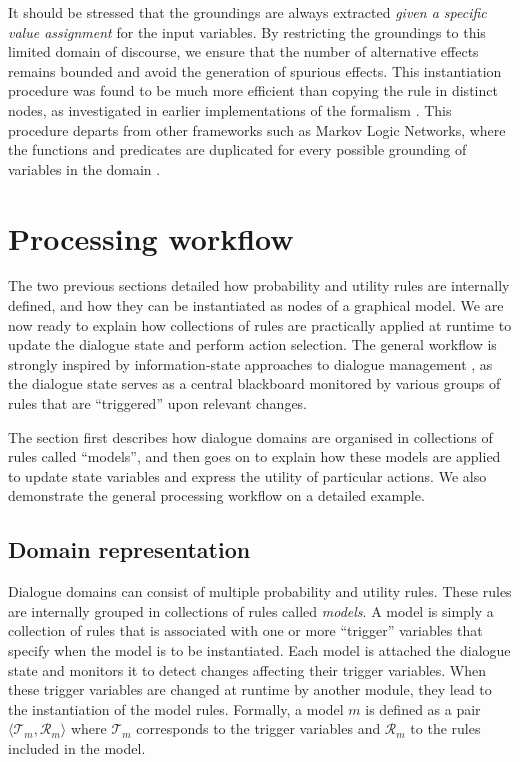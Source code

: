 It should be stressed that the groundings are always extracted \textit{given a specific value assignment} for the input variables. By restricting the groundings to this limited domain of discourse, we ensure that the number of alternative effects remains bounded and avoid the generation of spurious effects.   This instantiation procedure was found to be much more efficient than copying the rule in distinct nodes, as investigated in earlier implementations of the formalism \citep{relational-apl2012}.  This procedure departs from other frameworks such as Markov Logic Networks, where the functions and predicates are duplicated for every possible grounding of variables in the domain \citep{Richardson:2006}.



%

\section{Processing workflow}
\label{sec:processing-workflow}

The two previous sections detailed how probability and utility rules are internally defined, and how they can be instantiated as nodes of a graphical model. We are now ready to explain how collections of rules are practically applied at runtime to update the dialogue state and perform action selection. The general workflow is strongly inspired by information-state approaches to dialogue management \citep{Larsson:2000}, as the dialogue state serves as a central blackboard monitored by various groups of rules that are ``triggered'' upon relevant changes. 

The section first describes how dialogue domains are organised in collections of rules called ``models'', and then goes on to explain how these models are applied to update state variables and express the utility of particular actions. We also demonstrate the general processing workflow on a detailed example. 


\subsection{Domain representation}

Dialogue domains can consist of multiple probability and utility rules. These rules are internally grouped in collections of rules called \textit{models}. A model is simply a collection of rules that is associated with one or more ``trigger'' variables that specify when the model is to be instantiated. Each model is attached the dialogue state and monitors it to detect changes affecting their trigger variables. When these trigger variables are changed at runtime by another module, they lead to the instantiation of the model rules. Formally, a model $m$ is defined as a pair $\langle \mathcal{T}_m, \mathcal{R}_m \rangle$ where $\mathcal{T}_m$ corresponds to the trigger variables and $\mathcal{R}_m$ to the rules included in the model.

